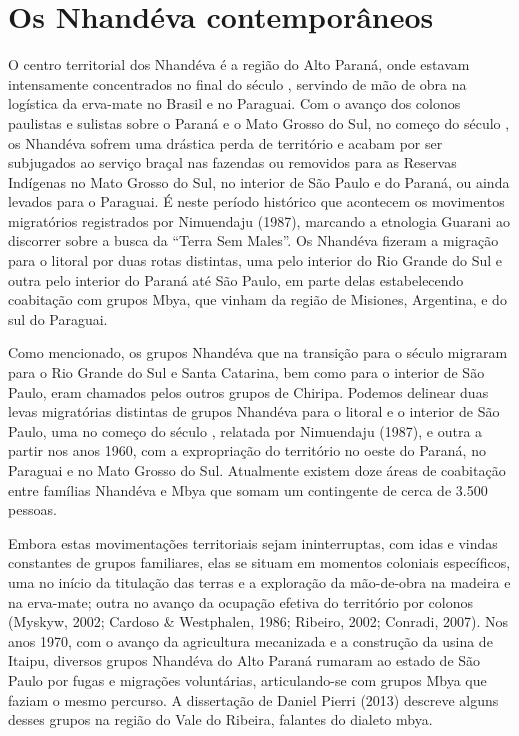 \section{Os Nhandéva contemporâneos}

O centro territorial dos Nhandéva é a região do Alto Paraná, onde
estavam intensamente concentrados no final do século , servindo de
mão de obra na logística da erva-mate no Brasil e no Paraguai. Com o
avanço dos colonos paulistas e sulistas sobre o Paraná e o Mato Grosso
do Sul, no começo do século , os Nhandéva sofrem uma drástica perda
de território e acabam por ser subjugados ao serviço braçal nas
fazendas ou removidos para as Reservas Indígenas no Mato Grosso do Sul,
no interior de São Paulo e do Paraná, ou ainda levados para o Paraguai.
É neste período histórico que acontecem os movimentos migratórios
registrados por Nimuendaju (1987), marcando a etnologia Guarani ao
discorrer sobre a busca da ``Terra Sem Males''. Os Nhandéva fizeram a
migração para o litoral por duas rotas distintas, uma pelo interior do
Rio Grande do Sul e outra pelo interior do Paraná até São Paulo, em
parte delas estabelecendo coabitação com grupos Mbya, que vinham da
região de Misiones, Argentina, e do sul do Paraguai.

Como mencionado, os grupos Nhandéva que na transição para o século 
migraram para o Rio Grande do Sul e Santa Catarina, bem como para o
interior de São Paulo, eram chamados pelos outros grupos de Chiripa.
Podemos delinear duas levas migratórias distintas de grupos Nhandéva
para o litoral e o interior de São Paulo, uma no começo do século ,
relatada por Nimuendaju (1987), e outra a partir nos anos 1960, com a
expropriação do território no oeste do Paraná, no Paraguai e no Mato
Grosso do Sul. Atualmente existem doze áreas de coabitação entre
famílias Nhandéva e Mbya que somam um contingente de cerca de 3.500
pessoas.

Embora estas movimentações territoriais sejam ininterruptas, com idas e
vindas constantes de grupos familiares, elas se situam em momentos
coloniais específicos, uma no início da titulação das terras e a
exploração da mão-de-obra na madeira e na erva-mate; outra no avanço da
ocupação efetiva do território por colonos (Myskyw, 2002; Cardoso \&
Westphalen, 1986; Ribeiro, 2002; Conradi, 2007). Nos anos 1970, com o
avanço da agricultura mecanizada e a construção da usina de Itaipu,
diversos grupos Nhandéva do Alto Paraná rumaram ao estado de São Paulo
por fugas e migrações voluntárias, articulando-se com grupos Mbya que
faziam o mesmo percurso. A dissertação de Daniel Pierri (2013) descreve
alguns desses grupos na região do Vale do Ribeira, falantes do dialeto
mbya.

